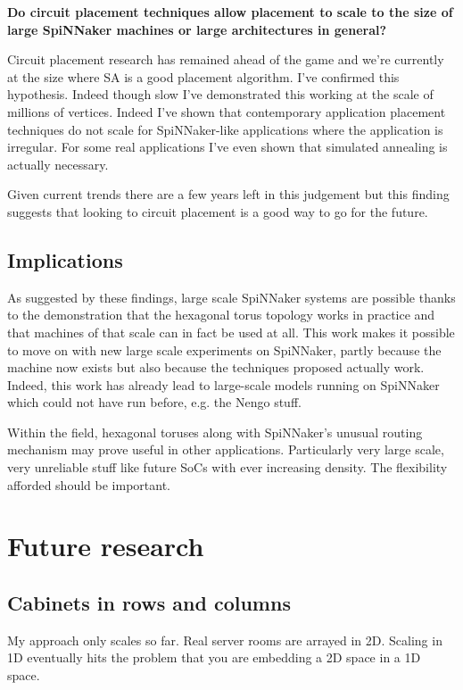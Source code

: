 		\textbf{Do circuit placement techniques allow placement to scale to the size of
		large SpiNNaker machines or large architectures in general?}
		
		Circuit placement research has remained ahead of the game and we're
		currently at the size where SA is a good placement algorithm. I've
		confirmed this hypothesis. Indeed though slow I've demonstrated this
		working at the scale of millions of vertices. Indeed I've shown that
		contemporary application placement techniques do not scale for
		SpiNNaker-like applications where the application is irregular. For some
		real applications I've even shown that simulated annealing is actually
		necessary.
		
		Given current trends there are a few years left in this judgement but this
		finding suggests that looking to circuit placement is a good way to go for
		the future.
	
	\subsection{Implications}
		
		As suggested by these findings, large scale SpiNNaker systems are possible
		thanks to the demonstration that the hexagonal torus topology works in
		practice and that machines of that scale can in fact be used at all. This
		work makes it possible to move on with new large scale experiments on
		SpiNNaker, partly because the machine now exists but also because the
		techniques proposed actually work. Indeed, this work has already lead to
		large-scale models running on SpiNNaker which could not have run before,
		e.g. the Nengo stuff.
		
		Within the field, hexagonal toruses along with SpiNNaker's unusual routing
		mechanism may prove useful in other applications. Particularly very large
		scale, very unreliable stuff like future SoCs with ever increasing density.
		The flexibility afforded should be important.
	
	\section{Future research}
		
		\subsection{Cabinets in rows and columns}
			
			My approach only scales so far. Real server rooms are arrayed in 2D.
			Scaling in 1D eventually hits the problem that you are embedding a 2D
			space in a 1D space.
			
